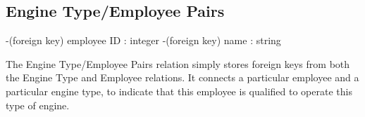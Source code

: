 \documentclass[a4paper]{article}
\begin{document}
\subsection*{Engine Type/Employee Pairs}
\begin{itemize}
-(foreign key) employee ID : integer
-(foreign key) name : string
\end{itemize}
The Engine Type/Employee Pairs relation simply stores foreign keys from both the Engine Type and Employee relations. It connects a particular employee and a particular engine type, to indicate that this employee is qualified to operate this type of engine.
\end{document}
